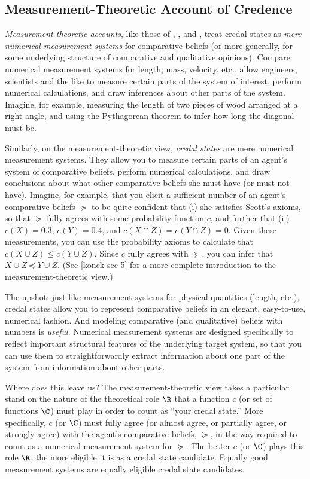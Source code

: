 \subsection{Measurement-Theoretic Account of Credence}


\textit{Measurement-theoretic accounts}, like those of \citet{Koopman1940b, Koopman1940a}, \citet{Good1950}, and \citet{Krantz1971}, treat credal states as \textit{mere numerical measurement systems} for comparative beliefs (or more generally, for some underlying structure of comparative and qualitative opinions). Compare: numerical measurement systems for length, mass, velocity, etc., allow engineers, scientists and the like to measure certain parts of the system of interest, perform numerical calculations, and draw inferences about other parts of the system. Imagine, for example, measuring the length of two pieces of wood arranged at a right angle, and using the Pythagorean theorem to infer how long the diagonal must be. 

Similarly, on the measurement-theoretic view, \textit{credal states} are mere numerical measurement systems. They allow you to measure certain parts of an agent's system of comparative beliefs, perform numerical calculations, and draw conclusions about what other comparative beliefs she must have (or must not have). Imagine, for example, that you elicit a sufficient number of an agent's comparative beliefs $\succeq$ to be quite confident that (i) she satisfies Scott's axioms, so that $\succeq$ fully agrees with some probability function $c$, and further that (ii) $c(X)=0.3$, $c(Y)=0.4$, and $c(X\cap Z)=c(Y\cap Z)=0$. Given these measurements, you can use the probability axioms to calculate that $c(X\cup Z)\leq c(Y\cup Z)$. Since $c$ fully agrees with $\succeq$, you can infer that $X\cup Z\preceq Y\cup Z$. (See \autoref{konek-sec-5} for a more complete introduction to the measurement-theoretic view.)

The upshot: just like measurement systems for physical quantities (length, etc.), credal states allow you to represent comparative beliefs in an elegant, easy-to-use, numerical fashion. And modeling comparative (and qualitative) beliefs with numbers is \textit{useful}. Numerical measurement systems are designed specifically to reflect important structural features of the underlying target system, so that you can use them to straightforwardly extract information about one part of the system from information about other parts.

Where does this leave us? The measurement-theoretic view takes a particular stand on the nature of the theoretical role $\R$ that a function $c$ (or set of functions $\C$) must play in order to count as ``your credal state.'' More specifically, $c$ (or $\C$) must fully agree (or almost agree, or partially agree, or strongly agree) with the agent's comparative beliefs, $\succeq$, in the way required to count as a numerical measurement system for $\succeq$. The better $c$ (or $\C$) plays this role $\R$, the more eligible it is as a credal state candidate. Equally good measurement systems are equally eligible credal state candidates.


